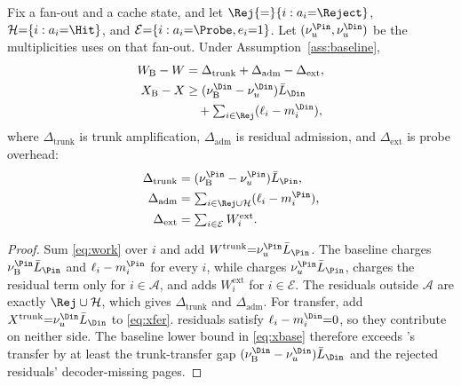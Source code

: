 \begin{proposition}[Accounting]
\label{prop:acct}
Fix a fan-out and a cache state, and let $\Rej{=}\{i:a_i{=}\Reject\}$, $\mathcal{H}{=}\{i:a_i{=}\Hit\}$, and $\mathcal{E}{=}\{i:a_i{=}\Probe,e_i{=}1\}$.
Let $(\nu_u^{\Pin},\nu_u^{\Din})$ be the multiplicities \sys uses on that fan-out.
Under Assumption~\ref{ass:baseline},
\begin{align}
W_{\mathrm{B}}-W &= \Delta_{\mathrm{trunk}}+\Delta_{\mathrm{adm}}-\Delta_{\mathrm{ext}}, \label{eq:acct}\\
X_{\mathrm{B}}-X &\ge (\nu_{\mathrm{B}}^{\Din}-\nu_u^{\Din})\bar L_{\Din} \nonumber\\
&\quad +\textstyle\sum_{i\in\Rej}(\ell_i-m_i^{\Din}), \label{eq:xacct}
\end{align}
where $\Delta_{\mathrm{trunk}}$ is trunk amplification, $\Delta_{\mathrm{adm}}$ is residual admission, and $\Delta_{\mathrm{ext}}$ is probe overhead:
\begin{equation}
\label{eq:deltas}
\begin{aligned}
\Delta_{\mathrm{trunk}} &= (\nu_{\mathrm{B}}^{\Pin}-\nu_u^{\Pin})\bar L_{\Pin},\\
\Delta_{\mathrm{adm}} &= \textstyle\sum_{i\in\Rej\cup\mathcal{H}}(\ell_i-m_i^{\Pin}),\\
\Delta_{\mathrm{ext}} &= \textstyle\sum_{i\in\mathcal{E}}W_i^{\mathrm{ext}}.
\end{aligned}
\end{equation}
\end{proposition}

\begin{proof}
Sum \eqref{eq:work} over $i$ and add $W^{\mathrm{trunk}}{=}\nu_u^{\Pin}\bar L_{\Pin}$.
The baseline charges $\nu_{\mathrm{B}}^{\Pin}\bar L_{\Pin}$ and $\ell_i-m_i^{\Pin}$ for every $i$, while \sys charges $\nu_u^{\Pin}\bar L_{\Pin}$, charges the residual term only for $i\in\mathcal{A}$, and adds $W_i^{\mathrm{ext}}$ for $i\in\mathcal{E}$.
The residuals outside $\mathcal{A}$ are exactly $\Rej\cup\mathcal{H}$, which gives $\Delta_{\mathrm{trunk}}$ and $\Delta_{\mathrm{adm}}$.
For transfer, add $X^{\mathrm{trunk}}{=}\nu_u^{\Din}\bar L_{\Din}$ to \eqref{eq:xfer}.
\Hit residuals satisfy $\ell_i-m_i^{\Din}{=}0$, so they contribute on neither side.
The baseline lower bound in \eqref{eq:xbase} therefore exceeds \sys's transfer by at least the trunk-transfer gap $(\nu_{\mathrm{B}}^{\Din}-\nu_u^{\Din})\bar L_{\Din}$ and the rejected residuals' decoder-missing pages.
\end{proof}

